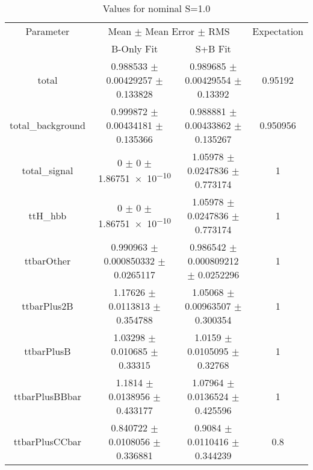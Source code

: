 \begin{table}
\centering
\caption{Values for nominal S=1.0}
\begin{tabular}{cccc}
\toprule
Parameter & \multicolumn{2}{c}{Mean $\pm$ Mean Error $\pm$ RMS} & Expectation\\
 & B-Only Fit & S+B Fit & \\
\midrule
total & \num{0.988533} $\pm$ \num{0.00429257} $\pm$ \num{0.133828} & \num{0.989685} $\pm$ \num{0.00429554} $\pm$ \num{0.13392} & \num{0.95192}\\
total\_background & \num{0.999872} $\pm$ \num{0.00434181} $\pm$ \num{0.135366} & \num{0.988881} $\pm$ \num{0.00433862} $\pm$ \num{0.135267} & \num{0.950956}\\
total\_signal & \num{0} $\pm$ \num{0} $\pm$ \num{1.86751e-10} & \num{1.05978} $\pm$ \num{0.0247836} $\pm$ \num{0.773174} & \num{1}\\
ttH\_hbb & \num{0} $\pm$ \num{0} $\pm$ \num{1.86751e-10} & \num{1.05978} $\pm$ \num{0.0247836} $\pm$ \num{0.773174} & \num{1}\\
ttbarOther & \num{0.990963} $\pm$ \num{0.000850332} $\pm$ \num{0.0265117} & \num{0.986542} $\pm$ \num{0.000809212} $\pm$ \num{0.0252296} & \num{1}\\
ttbarPlus2B & \num{1.17626} $\pm$ \num{0.0113813} $\pm$ \num{0.354788} & \num{1.05068} $\pm$ \num{0.00963507} $\pm$ \num{0.300354} & \num{1}\\
ttbarPlusB & \num{1.03298} $\pm$ \num{0.010685} $\pm$ \num{0.33315} & \num{1.0159} $\pm$ \num{0.0105095} $\pm$ \num{0.32768} & \num{1}\\
ttbarPlusBBbar & \num{1.1814} $\pm$ \num{0.0138956} $\pm$ \num{0.433177} & \num{1.07964} $\pm$ \num{0.0136524} $\pm$ \num{0.425596} & \num{1}\\
ttbarPlusCCbar & \num{0.840722} $\pm$ \num{0.0108056} $\pm$ \num{0.336881} & \num{0.9084} $\pm$ \num{0.0110416} $\pm$ \num{0.344239} & \num{0.8}\\
\bottomrule
\end{tabular}
\end{table}